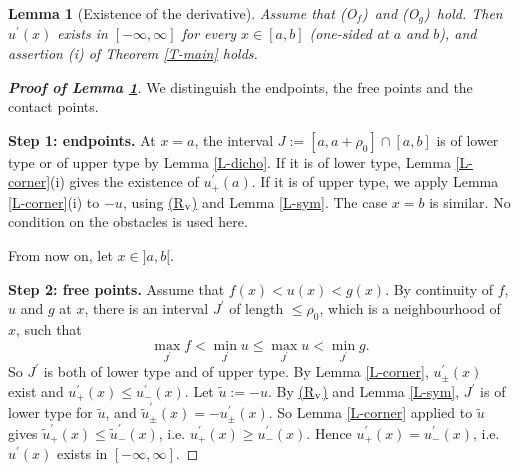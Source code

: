 \documentclass[reqno,12pt]{amsart}
\numberwithin{equation}{section}
\def\Of{{\sf (O$_f$)}}
\newcommand{\Rv}{\hyperref[HypS1]{{\sf (R$_{\rm v}$)}}}
\def\Og{{\sf (O$_g$)}}
\newtheorem{lemma}[theorem]{Lemma}
\theoremstyle{remark}
\begin{document}
\begin{lemma}[Existence of the derivative]\label{L-exist}
Assume that \Of\ and \Og\ hold. Then $u^\prime(x)$ exists in $[-\infty,\infty]$ for every $x\in[a,b]$ {\rm(}one-sided at $a$ and $b${\rm)}, and assertion {\rm(i)} of Theorem {\rm\ref{T-main}} holds.
\end{lemma}

\begin{proof}[\bf Proof of Lemma \ref{L-exist}]
We distinguish the endpoints, the free points and the contact points.

\medskip

{\bf Step 1: endpoints.} At $x=a$, the interval $J:=[a,a+\rho_0]\cap[a,b]$ is of lower type or of upper type by Lemma \ref{L-dicho}. If it is of lower type, Lemma \ref{L-corner}(i) gives the existence of $u^\prime_+(a)$. If it is of upper type, we apply Lemma \ref{L-corner}(i) to $-u$, using \Rv{} and Lemma \ref{L-sym}. The case $x=b$ is similar. No condition on the obstacles is used here.

\smallskip

From now on, let $x\in]a,b[$.

\medskip

{\bf Step 2: free points.} Assume that $f(x)<u(x)<g(x)$. By continuity of $f$, $u$ and $g$ at $x$, there is an interval $J^\prime$ of length $\leq\rho_0$, which is a neighbourhood of $x$, such that
\begin{equation*}
\max_{J^\prime}f<\min_{J^\prime}u\leq\max_{J^\prime}u<\min_{J^\prime}g.
\end{equation*}
So $J^\prime$ is both of lower type and of upper type. By Lemma \ref{L-corner}, $u^\prime_\pm(x)$ exist and $u^\prime_+(x)\leq u^\prime_-(x)$. Let $\widetilde u:=-u$. By \Rv{} and Lemma \ref{L-sym}, $J^\prime$ is of lower type for $\widetilde u$, and $\widetilde u^\prime_\pm(x)=-u^\prime_\pm(x)$. So Lemma \ref{L-corner} applied to $\widetilde u$ gives $\widetilde u^\prime_+(x)\leq\widetilde u^\prime_-(x)$, i.e. $u^\prime_+(x)\geq u^\prime_-(x)$. Hence $u^\prime_+(x)=u^\prime_-(x)$, i.e. $u^\prime(x)$ exists in $[-\infty,\infty]$.

\medskip


\end{proof}
\end{document}
